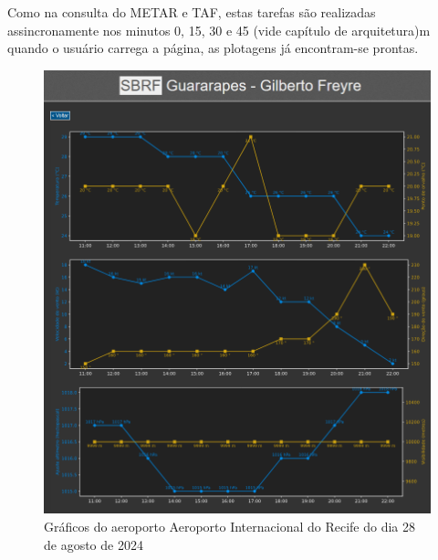 Como na consulta do METAR e TAF, estas tarefas são realizadas assincronamente nos minutos 0, 15, 30 e 45 (vide capítulo
de arquitetura)m quando o usuário carrega a página, as plotagens já encontram-se prontas.

\begin{figure}[ht]
    \begin{center}
    \includegraphics[width=400pt]{img/plots-SBRF.png}
    \caption{Gráficos do aeroporto Aeroporto Internacional do Recife do dia 28 de agosto de 2024}
    \label{fig:sbrf-plot}
    \end{center}
\end{figure}